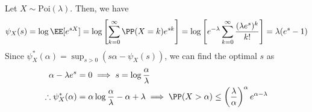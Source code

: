 \begin{hw}
Let $X \sim \text{Poi}(\lambda)$. Then, we have
\[
\psi_X(s) = \log \EE[e^{sX}] = \log\left[\sum_{k = 0}^\infty \PP(X=k)e^{sk}\right] = \log\left[e^{-\lambda}\sum_{k=0}^\infty \frac{(\lambda e^s)^k}{k!}\right] = \lambda (e^s - 1) 
\]
Since $\psi_X^*(\alpha) = \sup_{s > 0} \left( s\alpha - \psi_X(s)\right)$, we can find the optimal $s$ as
\begin{align*}
    \alpha - \lambda e^{s} &= 0 \implies s = \log\frac{\alpha}{\lambda} \\
\therefore \psi_X^*(\alpha) &=\alpha\log\frac{\alpha}{\lambda} - \alpha + \lambda \implies \PP(X > \alpha) \leq \left(\frac\lambda\alpha\right)^\alpha e^{\alpha - \lambda}
\end{align*}
\end{hw}